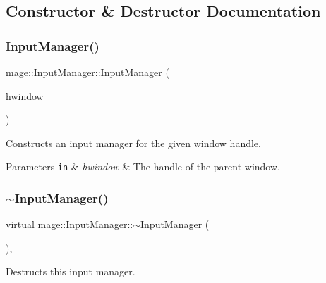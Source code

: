 \subsection{Constructor \& Destructor Documentation}
\hypertarget{classmage_1_1_input_manager_afc28df27a0251c242113a9761c007534}{}\label{classmage_1_1_input_manager_afc28df27a0251c242113a9761c007534} 
\subsubsection{\texorpdfstring{Input\+Manager()}{InputManager()}\hspace{0.1cm}{\footnotesize\ttfamily [1/2]}}
{\footnotesize\ttfamily mage\+::\+Input\+Manager\+::\+Input\+Manager (\begin{DoxyParamCaption}\item[{H\+W\+ND}]{hwindow }\end{DoxyParamCaption})}

Constructs an input manager for the given window handle.


\begin{DoxyParams}[1]{Parameters}
\mbox{\tt in}  & {\em hwindow} & The handle of the parent window. \\
\hline
\end{DoxyParams}
\hypertarget{classmage_1_1_input_manager_a6e6e612b3b2bacb4ee5d0fcfde35a275}{}\label{classmage_1_1_input_manager_a6e6e612b3b2bacb4ee5d0fcfde35a275} 
\subsubsection{\texorpdfstring{$\sim$\+Input\+Manager()}{~InputManager()}}
{\footnotesize\ttfamily virtual mage\+::\+Input\+Manager\+::$\sim$\+Input\+Manager (\begin{DoxyParamCaption}{ }\end{DoxyParamCaption})\hspace{0.3cm}{\ttfamily [virtual]}, {\ttfamily [default]}}

Destructs this input manager. \hypertarget{classmage_1_1_input_manager_a68503617f418bf270dc39bb18019b46d}{}\label{classmage_1_1_input_manager_a68503617f418bf270dc39bb18019b46d} 
